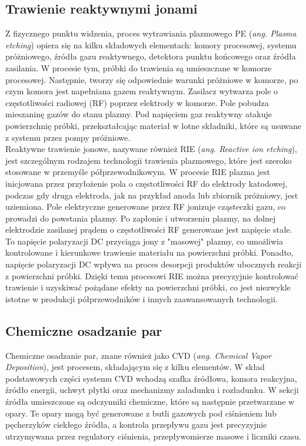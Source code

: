 \documentclass{article}
\begin{document}
\subsection{Trawienie reaktywnymi jonami}

Z fizycznego punktu widzenia, proces wytrawiania plazmowego PE (\textit{ang. Plasma etching}) opiera się na kilku składowych elementach: komory procesowej, systemu próżniowego, źródła gazu reaktywnego, detektora punktu końcowego oraz źródła zasilania. W procesie tym, próbki do trawienia są umieszczane w komorze procesowej. Następnie, tworzy się odpowiednie warunki próżniowe w komorze, po czym komora jest napełniana gazem reaktywnym.
Zasilacz wytwarza pole o częstotliwości radiowej (RF) poprzez elektrody w komorze. Pole pobudza mieszaninę gazów do stanu plazmy. Pod napięciem gaz reaktywny atakuje powierzchnię próbki, przekształcając materiał w lotne składniki, które są usuwane z systemu przez pompy próżniowe. \\

\noindent Reaktywne trawienie jonowe, nazywane również RIE (\textit{ang. Reactive ion etching}), jest szczególnym rodzajem technologii trawienia plazmowego, które jest szeroko stosowane w przemyśle półprzewodnikowym. W procesie RIE plazma jest inicjowana przez przyłożenie pola o częstotliwości RF do elektrody katodowej, podczas gdy druga elektroda, jak na przykład anoda lub zbiornik próżniowy, jest uziemiona. Pole elektryczne generowane przez RF jonizuje cząsteczki gazu, co prowadzi do powstania plazmy.
Po zapłonie i utworzeniu plazmy, na dolnej elektrodzie zasilanej prądem o częstotliwości RF generowane jest napięcie stałe. To napięcie polaryzacji DC przyciąga jony z "masowej" plazmy, co umożliwia kontrolowane i kierunkowe trawienie materiału na powierzchni próbki. Ponadto, napięcie polaryzacji DC wpływa na proces desorpcji produktów ubocznych reakcji z powierzchni próbki. Dzięki temu procesowi RIE można precyzyjnie kontrolować trawienie i uzyskiwać pożądane efekty na powierzchni próbki, co jest niezwykle istotne w produkcji półprzewodników i innych zaawansowanych technologii. 

\subsection{Chemiczne osadzanie par}
Chemiczne osadzanie par, znane również jako CVD (\textit{ang. Chemical Vapor Deposition}), jest procesem, składającym się z kilku elementów. W skład podstawowych części systemu CVD wchodzą szafka źródłowa, komora reakcyjna, źródło energii, uchwyt płytki oraz mechanizmy załadunku i rozładunku. W sekcji źródła umieszczone są odczynniki chemiczne, które są następnie przetwarzane w opary. Te opary mogą być generowane z butli gazowych pod ciśnieniem lub pęcherzyków ciekłego źródła, a kontrola przepływu gazu jest precyzyjnie utrzymywana przez regulatory ciśnienia, przepływomierze masowe i liczniki czasu. \\
\end{document}
